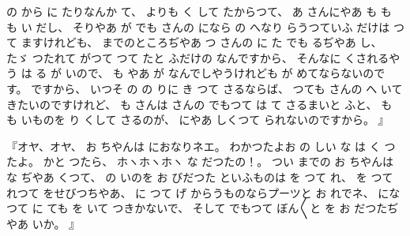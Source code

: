 %
の
から
に
たりなんか
て、
%
よりも
く
して
たからつて、
%
あ
さんにやあ
も
も
も
い
だし、
%
そりやあ
が
でも
さんの
になら
の
へなり
らうつていふ
だけは
つて
ますけれども、
%
までのところぢやあ
つ
さんの
に
た
でも
るぢやあ
し、
%
たゞ
つたれて
がつて
つて
たと
ふだけの
なんですから、
%
そんなに
くされるやう
は
る
が
いので、
%
も
やあ
が
なんでしやうけれども
が
めてならないのです。
%
ですから、
%
いつそ
の
の
りに
き
つて
さるならば、
%
つても
さんの
へ
いて
きたいのですけれど、
%
も
さんは
さんの
でもつて
は
て
さるまいと
ふと、
%
も
も
いものを
り
くして
さるのが、
%
にやあ
しくつて
られないのですから。
』

%
『オヤ、オヤ、
%
お
ちやんは
におなりネエ。
%
わかつたよお
の
しい
な
は
く
つたよ。
%
かと
つたら、
%
ホヽホヽホヽ
な
だつたの！。
%
つい
までの
お
ちやんは
な
ぢやあ
くつて、
%
の
いのを
お
びだつた
といふものは
を
つて
れ、
%
を
つて
れつて
をせびつちやあ、
%
に
つて
げ
からうものならプーツと
お
れでネ、
%
になつて
に
ても
を
いて
つきかないで、
%
そして
でもつて
ぼん〳〵と
を
お
だつたぢやあ
いか。
』

